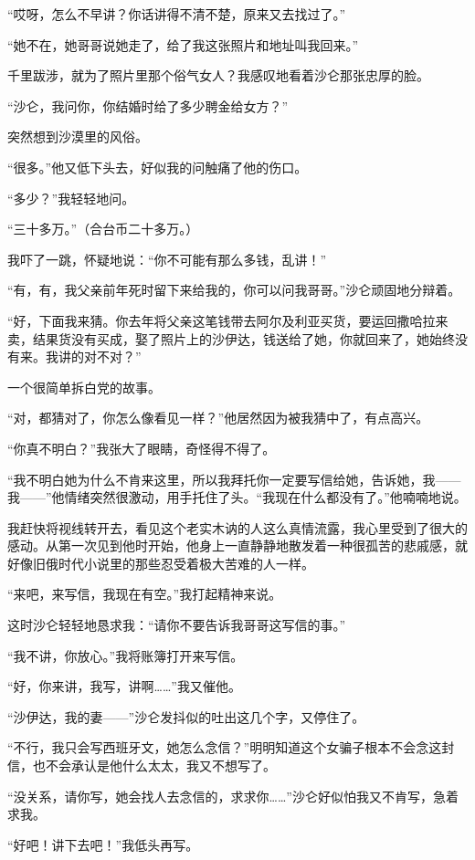 \par “哎呀，怎么不早讲？你话讲得不清不楚，原来又去找过了。”
\par “她不在，她哥哥说她走了，给了我这张照片和地址叫我回来。”
\par 千里跋涉，就为了照片里那个俗气女人？我感叹地看着沙仑那张忠厚的脸。
\par “沙仑，我问你，你结婚时给了多少聘金给女方？”
\par 突然想到沙漠里的风俗。
\par “很多。”他又低下头去，好似我的问触痛了他的伤口。
\par “多少？”我轻轻地问。
\par “三十多万。”（合台币二十多万。）
\par 我吓了一跳，怀疑地说：“你不可能有那么多钱，乱讲！”
\par “有，有，我父亲前年死时留下来给我的，你可以问我哥哥。”沙仑顽固地分辩着。
\par “好，下面我来猜。你去年将父亲这笔钱带去阿尔及利亚买货，要运回撒哈拉来卖，结果货没有买成，娶了照片上的沙伊达，钱送给了她，你就回来了，她始终没有来。我讲的对不对？”
\par 一个很简单拆白党的故事。
\par “对，都猜对了，你怎么像看见一样？”他居然因为被我猜中了，有点高兴。
\par “你真不明白？”我张大了眼睛，奇怪得不得了。
\par “我不明白她为什么不肯来这里，所以我拜托你一定要写信给她，告诉她，我——我——”他情绪突然很激动，用手托住了头。“我现在什么都没有了。”他喃喃地说。
\par 我赶快将视线转开去，看见这个老实木讷的人这么真情流露，我心里受到了很大的感动。从第一次见到他时开始，他身上一直静静地散发着一种很孤苦的悲戚感，就好像旧俄时代小说里的那些忍受着极大苦难的人一样。
\par “来吧，来写信，我现在有空。”我打起精神来说。
\par 这时沙仑轻轻地恳求我：“请你不要告诉我哥哥这写信的事。”
\par “我不讲，你放心。”我将账簿打开来写信。
\par “好，你来讲，我写，讲啊……”我又催他。
\par “沙伊达，我的妻——”沙仑发抖似的吐出这几个字，又停住了。
\par “不行，我只会写西班牙文，她怎么念信？”明明知道这个女骗子根本不会念这封信，也不会承认是他什么太太，我又不想写了。
\par “没关系，请你写，她会找人去念信的，求求你……”沙仑好似怕我又不肯写，急着求我。
\par “好吧！讲下去吧！”我低头再写。
